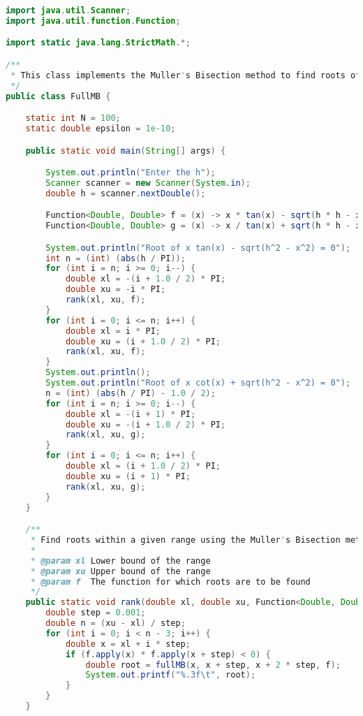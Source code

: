 \documentclass[UTF8]{ctexart}
\begin{document}
    \begin{lstlisting}[language=Java, breaklines = true,label={lst:lstlisting3}]
import java.util.Scanner;
import java.util.function.Function;

import static java.lang.StrictMath.*;

/**
 * This class implements the Muller's Bisection method to find roots of transcendental equations.
 */
public class FullMB {

    static int N = 100;
    static double epsilon = 1e-10;

    public static void main(String[] args) {

        System.out.println("Enter the h");
        Scanner scanner = new Scanner(System.in);
        double h = scanner.nextDouble();

        Function<Double, Double> f = (x) -> x * tan(x) - sqrt(h * h - x * x);
        Function<Double, Double> g = (x) -> x / tan(x) + sqrt(h * h - x * x);

        System.out.println("Root of x tan(x) - sqrt(h^2 - x^2) = 0");
        int n = (int) (abs(h / PI));
        for (int i = n; i >= 0; i--) {
            double xl = -(i + 1.0 / 2) * PI;
            double xu = -i * PI;
            rank(xl, xu, f);
        }
        for (int i = 0; i <= n; i++) {
            double xl = i * PI;
            double xu = (i + 1.0 / 2) * PI;
            rank(xl, xu, f);
        }
        System.out.println();
        System.out.println("Root of x cot(x) + sqrt(h^2 - x^2) = 0");
        n = (int) (abs(h / PI) - 1.0 / 2);
        for (int i = n; i >= 0; i--) {
            double xl = -(i + 1) * PI;
            double xu = -(i + 1.0 / 2) * PI;
            rank(xl, xu, g);
        }
        for (int i = 0; i <= n; i++) {
            double xl = (i + 1.0 / 2) * PI;
            double xu = (i + 1) * PI;
            rank(xl, xu, g);
        }
    }

    /**
     * Find roots within a given range using the Muller's Bisection method.
     *
     * @param xl Lower bound of the range
     * @param xu Upper bound of the range
     * @param f  The function for which roots are to be found
     */
    public static void rank(double xl, double xu, Function<Double, Double> f) {
        double step = 0.001;
        double n = (xu - xl) / step;
        for (int i = 0; i < n - 3; i++) {
            double x = xl + i * step;
            if (f.apply(x) * f.apply(x + step) < 0) {
                double root = fullMB(x, x + step, x + 2 * step, f);
                System.out.printf("%.3f\t", root);
            }
        }
    }


\end{lstlisting}
\end{document}
